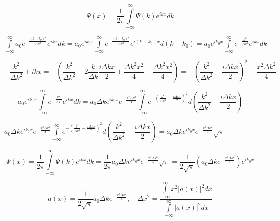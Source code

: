 \documentclass[a4paper,12pt]{article}
\begin{document}
	\begin{equation}
		\Psi(x) = \dfrac{1}{2\pi} \displaystyle\int\limits_{-\infty}^{\infty} \overline{\Psi}(k) e^{ikx} dk 
	\end{equation}
	
	\begin{center}
		$\displaystyle\int\limits_{-\infty}^{\infty} a_0 e^{-\frac{(k-k_0)^2}{\Delta k^2}} e^{ikx} dk = a_0 e^{ik_0 x} \displaystyle\int\limits_{-\infty}^{\infty} e^{-\frac{(k-k_0)^2}{\Delta k^2}} e^{i(k-k_0)x} d(k-k_0) = a_0 e^{ik_0 x} \displaystyle\int\limits_{-\infty}^{\infty} e^{-\frac{k^2}{\Delta k^2}} e^{ikx} dk $
	
		$ -\dfrac{k^2}{\Delta k^2} + ikx = -\left(\dfrac{k^2}{\Delta k^2} - 2 \dfrac{k}{\Delta k} \dfrac{i\Delta k x}{2} + \dfrac{\Delta k^2 x^2}{4} - \dfrac{\Delta k^2 x^2}{4}\right) = -\left(\dfrac{k^2}{\Delta k^2} - \dfrac{i\Delta k x}{2}\right)^2 - \dfrac{x^2 \Delta k^2}{4} $
	\end{center}
	
	\begin{equation}
		a_0 e^{ik_0 x} \displaystyle\int\limits_{-\infty}^{\infty} e^{-\frac{k^2}{\Delta k^2}} e^{ikx} dk = a_0 \Delta k e^{ik_0 x} e^{-\frac{x^2 \Delta k^2}{4}} \displaystyle\int\limits_{-\infty}^{\infty} e^{-\left(\frac{k^2}{\Delta k^2} - \frac{i\Delta k x}{2}\right)^2} d\left(\dfrac{k^2}{\Delta k^2} - \dfrac{i\Delta k x}{2}\right) 
	\end{equation}
	
	\begin{center}
		$a_0 \Delta k e^{ik_0 x} e^{-\frac{x^2 \Delta k^2}{4}} \displaystyle\int\limits_{-\infty}^{\infty} e^{-\left(\frac{k^2}{\Delta k^2} - \frac{i\Delta k x}{2}\right)^2} d\left(\dfrac{k^2}{\Delta k^2} - \dfrac{i\Delta k x}{2}\right) = a_0 \Delta k e^{ik_0 x} e^{-\frac{x^2 \Delta k^2}{4}} \sqrt{\pi} $
	\end{center}
	
	\begin{equation}
		\Psi (x) = \dfrac{1}{2\pi} \displaystyle\int\limits_{-\infty}^{\infty} \overline{\Psi}(k) e^{ikx} dk = \dfrac{1}{2\pi } a_0 \Delta k e^{ik_0 x} e^{-\frac{x^2 \Delta k^2}{4}} \sqrt{\pi} = \dfrac{1}{2\sqrt{\pi}} \left(a_0 \Delta k e^{-\frac{x^2 \Delta k^2}{4}}\right) e^{ik_0 x}
	\end{equation}
	
	\begin{equation}
		a(x) = \dfrac{1}{2\sqrt{\pi}} a_0 \Delta k e^{-\frac{x^2 \Delta k^2}{4}} , \quad \Delta x^2 = \dfrac{\displaystyle\int\limits_{-\infty}^{\infty} x^2 \left| a(x) \right|^2 dx}{ \displaystyle\int\limits_{-\infty}^{\infty} \left|a(x)\right|^2 dx} 
	\end{equation}
	
\end{document}
